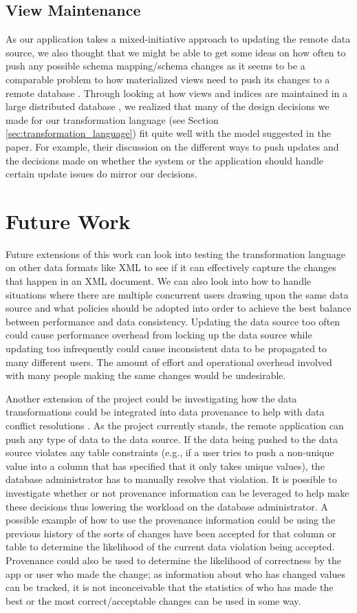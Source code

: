 \documentclass[12pt]{article}
\begin{document}
\subsection{View Maintenance}
As our application takes a mixed-initiative approach to updating the remote data source, we also thought that we might be able to get some ideas on how often to push any possible schema mapping/schema changes as it seems to be a comparable problem to how materialized views need to push its changes to a remote database \cite{agrawal1997efficient, agrawal2009asynchronous, zhou2007lazy}. Through looking at how views and indices are maintained in a large distributed database \cite{agrawal1997efficient}, we realized that many of the design decisions we made for our transformation language (see Section \ref{sec:transformation_language}) fit quite well with the model suggested in the paper. For example, their discussion on the different ways to push updates and the decisions made on whether the system or the application should handle certain update issues do mirror our decisions.

\section{Future Work}
Future extensions of this work can look into testing the transformation language on other data formats like XML to see if it can effectively capture the changes that happen in an XML document. We can also look into how to handle situations where there are multiple concurrent users drawing upon the same data source and what policies should be adopted into order to achieve the best balance between performance and data consistency. Updating the data source too often could cause performance overhead from locking up the data source while updating too infrequently could cause inconsistent data to be propagated to many different users. The amount of effort and operational overhead involved with many people making the same changes would be undesirable. 

Another extension of the project could be investigating how the data transformations could be integrated into data provenance to help with data conflict resolutions \cite{arniThesis}. As the project currently stands, the remote application can push any type of data to the data source. If the data being pushed to the data source violates any table constraints (e.g., if a user tries to push a non-unique value into a column that has specified that it only takes unique values), the database administrator has to manually resolve that violation. It is possible to investigate whether or not provenance information can be leveraged to help make these decisions thus lowering the workload on the database administrator. A possible example of how to use the provenance information could be using the previous history of the sorts of changes have been accepted for that column or table to determine the likelihood of the current data violation being accepted. Provenance could also be used to determine the likelihood of correctness by the app or user who made the change; as information about who has changed values can be tracked, it is not inconceivable that the statistics of who has made the best or the most correct/acceptable changes can be used in some way.
\end{document}
